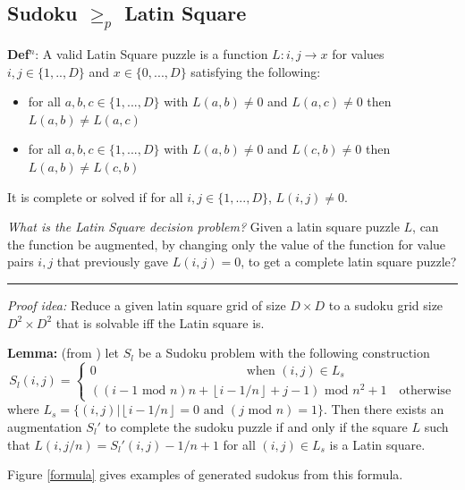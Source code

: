 \documentclass[a4paper,11pt]{report}
\newcounter{row}
\begin{document}
\subsection{Sudoku $\geq_p$ Latin Square}

\textbf{Def$^n$}: A valid Latin Square puzzle is a function $L:i,j \rightarrow x$ for values $i,j \in \{1,..,D\} $ and $x \in
\{0,...,D\}$ satisfying the following:
\begin{itemize}
\item{for all $a,b,c \in \{1,...,D\}$ with $L(a,b) \neq 0 $ and $L(a,c) \neq 0$ then $L(a,b) \neq L(a,c)$}
\item{for all $a,b,c \in \{1,...,D\}$ with $L(a,b) \neq 0 $ and $L(c,b) \neq 0$ then $L(a,b) \neq L(c,b)$}
\end{itemize}
It is complete or solved if for all $i,j \in \{1,...,D\}$, $L(i,j) \neq 0$.

\textit{What is the Latin Square decision problem?} Given a latin square puzzle $L$, can the function be augmented, by changing only the value of the function for value pairs $i,j$ that previously gave $L(i,j) =0$, to get a complete latin square puzzle?

\noindent\rule{4cm}{0.4pt}

\textit{Proof idea:} Reduce a given latin square grid of size $D \times D$ to a sudoku grid size $D^2 \times D^2$ that is solvable iff the Latin square is.

\textbf{Lemma:} (from \cite{sls}) let $S_l$ be a Sudoku problem with the following construction 
\begin{equation}
	S_l(i,j) =\begin{cases}
0 \qquad\qquad\qquad\qquad\qquad\qquad\text{when } (i,j) \in L_s \\ 
((i-1 \text{ mod } n)n + \left\lfloor{i-1/n}\right\rfloor+j-1)\text{ mod } n^2 +1 \quad\text{otherwise}
\end{cases}
\end{equation}
where $L_s=\{(i,j)| \left\lfloor{i-1/n}\right\rfloor=0 \text{ and }(j \text{ mod }n)=1\}$. Then there exists an augmentation $S_l'$ to complete the sudoku puzzle if and only if the square $L$ such that $L(i,j/n)=S_l'(i,j)-1/n+1$ for all $(i,j) \in L_s$ is a Latin square.

Figure \ref{formula} gives examples of generated sudokus from this formula.
\end{document}
